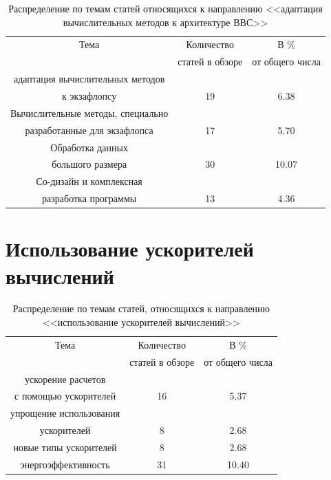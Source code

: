 \begin{table}[ht]
	\caption{Распределение по темам статей относящихся к направлению
		<<адаптация вычислительных методов к архитектуре ВВС>>}
	\begin{center}
		\begin{tabular}{|c|c|c|}
			\hline
			Тема                       & Количество          & В \%           \\
			& статей в обзоре     & от общего числа  \\ \hline 
			адаптация вычислительных методов   &   & \\
			к экзафлопсу                       & 19 & 6.38  \\ \hline 
			Вычислительные методы, специально & & \\
			разработанные для экзафлопса & 17 & 5.70 \\ \hline 
			Обработка данных  & & \\
			большого размера  & 30 & 10.07 \\ \hline 
			Со-дизайн и комплексная        &    &     \\      
			разработка программы           & 13 & 4.36   \\  \hline 
			
		\end{tabular}
	\end{center}
	\label{topic_special}
\end{table}

\clearpage

\section{Использование ускорителей вычислений}

\begin{table}[ht]
	\caption{Распределение по темам статей, относящихся к направлению
		<<использование ускорителей вычислений>>}
	\begin{center}
		\begin{tabular}{|c|c|c|}
			\hline
			Тема                       & Количество          & В \%           \\
			& статей в обзоре     & от общего числа  \\ \hline 
			
			ускорение расчетов    &    &       \\ 
			с помощью ускорителей & 16 & 5.37  \\ \hline 
			упрощение использования  & & \\
			ускорителей & 8  & 2.68   \\ \hline 
			новые типы ускорителей & 8 & 2.68    \\ \hline 
			энергоэффективность &  31  & 10.40     \\ \hline 
		\end{tabular}
	\end{center}
	\label{topic_GPU}
\end{table}




